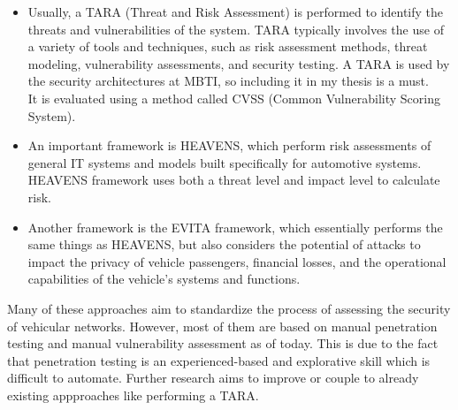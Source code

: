 \begin{itemize}

\item Usually, a TARA (Threat and Risk Assessment)\cite{tara} is performed to identify the threats and vulnerabilities of the system. 
TARA typically involves the use of a variety of tools and techniques, such as risk assessment methods, threat modeling, vulnerability assessments, and security testing. 
A TARA is used by the security architectures at MBTI, so including it in my thesis is a must.\\
It is evaluated using a method called CVSS\cite{cvss} (Common Vulnerability Scoring System).

\item An important framework is HEAVENS, which perform risk assessments of general IT systems and models built specifically for automotive systems. 
HEAVENS framework uses both a threat level and impact level to calculate risk\cite{heavens}.

\item Another framework is the EVITA framework, which essentially performs the same things as HEAVENS, but also considers the potential of attacks to impact the privacy of vehicle passengers, financial losses, and the operational capabilities of the vehicle's systems and functions\cite{evita}.\\

\end{itemize}

Many of these approaches aim to standardize the process of assessing the security of vehicular networks.
However, most of them are based on manual penetration testing and manual vulnerability assessment as of today.
This is due to the fact that penetration testing is an experienced-based and explorative skill which is difficult to automate.
Further research aims to improve or couple to already existing appproaches like performing a TARA.

